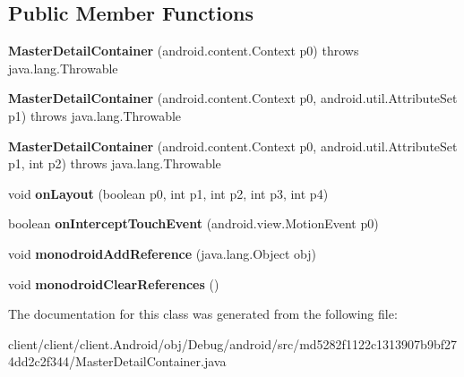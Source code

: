 \subsection*{Public Member Functions}
\begin{DoxyCompactItemize}
\item 
\hypertarget{classmd5282f1122c1313907b9bf274dd2c2f344_1_1MasterDetailContainer_abd915f7647a6176025cd45550d987f80}{}{\bfseries Master\+Detail\+Container} (android.\+content.\+Context p0)  throws java.\+lang.\+Throwable 	\label{classmd5282f1122c1313907b9bf274dd2c2f344_1_1MasterDetailContainer_abd915f7647a6176025cd45550d987f80}

\item 
\hypertarget{classmd5282f1122c1313907b9bf274dd2c2f344_1_1MasterDetailContainer_a94d64f58b1a83b0ffa33c095dab4fbb5}{}{\bfseries Master\+Detail\+Container} (android.\+content.\+Context p0, android.\+util.\+Attribute\+Set p1)  throws java.\+lang.\+Throwable 	\label{classmd5282f1122c1313907b9bf274dd2c2f344_1_1MasterDetailContainer_a94d64f58b1a83b0ffa33c095dab4fbb5}

\item 
\hypertarget{classmd5282f1122c1313907b9bf274dd2c2f344_1_1MasterDetailContainer_ae1fafe7748af305347f3a157a370ae7b}{}{\bfseries Master\+Detail\+Container} (android.\+content.\+Context p0, android.\+util.\+Attribute\+Set p1, int p2)  throws java.\+lang.\+Throwable 	\label{classmd5282f1122c1313907b9bf274dd2c2f344_1_1MasterDetailContainer_ae1fafe7748af305347f3a157a370ae7b}

\item 
\hypertarget{classmd5282f1122c1313907b9bf274dd2c2f344_1_1MasterDetailContainer_a1c319fa891ed703f9e29daf01f32e922}{}void {\bfseries on\+Layout} (boolean p0, int p1, int p2, int p3, int p4)\label{classmd5282f1122c1313907b9bf274dd2c2f344_1_1MasterDetailContainer_a1c319fa891ed703f9e29daf01f32e922}

\item 
\hypertarget{classmd5282f1122c1313907b9bf274dd2c2f344_1_1MasterDetailContainer_ac533504762241a3645405d3a09cbb70d}{}boolean {\bfseries on\+Intercept\+Touch\+Event} (android.\+view.\+Motion\+Event p0)\label{classmd5282f1122c1313907b9bf274dd2c2f344_1_1MasterDetailContainer_ac533504762241a3645405d3a09cbb70d}

\item 
\hypertarget{classmd5282f1122c1313907b9bf274dd2c2f344_1_1MasterDetailContainer_a3aa43158e8ec4c99ad9c0553714ba3a3}{}void {\bfseries monodroid\+Add\+Reference} (java.\+lang.\+Object obj)\label{classmd5282f1122c1313907b9bf274dd2c2f344_1_1MasterDetailContainer_a3aa43158e8ec4c99ad9c0553714ba3a3}

\item 
\hypertarget{classmd5282f1122c1313907b9bf274dd2c2f344_1_1MasterDetailContainer_a483312b38294682040b394480ce1ed0e}{}void {\bfseries monodroid\+Clear\+References} ()\label{classmd5282f1122c1313907b9bf274dd2c2f344_1_1MasterDetailContainer_a483312b38294682040b394480ce1ed0e}

\end{DoxyCompactItemize}


The documentation for this class was generated from the following file\+:\begin{DoxyCompactItemize}
\item 
client/client/client.\+Android/obj/\+Debug/android/src/md5282f1122c1313907b9bf274dd2c2f344/Master\+Detail\+Container.\+java\end{DoxyCompactItemize}
